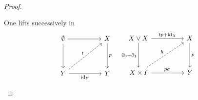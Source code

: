 \documentclass[../main]{subfiles}
\begin{document}
\begin{proof}\phantom{}
\begin{implyenumerate}
    \item[(i) $\implies$ (ii)]  One lifts successively in
\begin{equation*}
    \begin{tikzcd}
    \emptyset \arrow[dd] \arrow[rr]                  &  & X \arrow[dd, "p"] \\
                                                     &  &                   \\
    Y \arrow[rr, "\id_Y"'] \arrow[rruu, "t", dashed] &  & Y                
    \end{tikzcd}
    \quad 
    \begin{tikzcd}
    X \vee X \arrow[dd, "\partial_0+\partial_1"'] \arrow[rr, "tp+\id_X"] &  & X \arrow[dd, "p"] \\
                                                                         &  &                   \\
    X\times I \arrow[rr, "p\sigma"] \arrow[rruu, "h", dashed]            &  & Y                
    \end{tikzcd}
\end{equation*}
    

\end{implyenumerate}
\end{proof}
\end{document}
